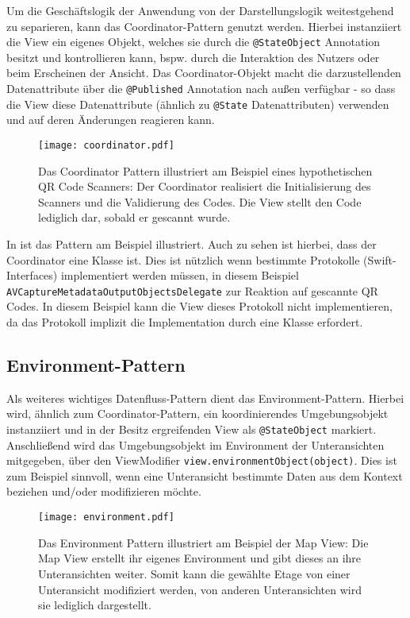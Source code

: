 Um die Geschäftslogik der Anwendung von der Darstellungslogik weitestgehend zu separieren, kann das Coordinator-Pattern genutzt werden. Hierbei instanziiert die View ein eigenes Objekt, welches sie durch die \texttt{@StateObject} Annotation besitzt und kontrollieren kann, bspw. durch die Interaktion des Nutzers oder beim Erscheinen der Ansicht. Das Coordinator-Objekt macht die darzustellenden Datenattribute über die \texttt{@Published} Annotation nach außen verfügbar - so dass die View diese Datenattribute (ähnlich zu \texttt{@State} Datenattributen) verwenden und auf deren Änderungen reagieren kann.

\begin{figure}[H]
\texttt{[image: coordinator.pdf]}
\caption{Das Coordinator Pattern illustriert am Beispiel eines hypothetischen QR Code Scanners: Der Coordinator realisiert die Initialisierung des Scanners und die Validierung des Codes. Die View stellt den Code lediglich dar, sobald er gescannt wurde.}\label{fig:coordinator}
\end{figure}

In  ist das Pattern am Beispiel illustriert. Auch zu sehen ist hierbei, dass der Coordinator eine Klasse ist. Dies ist nützlich wenn bestimmte Protokolle (Swift-Interfaces) implementiert werden müssen, in diesem Beispiel \texttt{AVCaptureMetadataOutputObjectsDelegate} zur Reaktion auf gescannte QR Codes. In diesem Beispiel kann die View dieses Protokoll nicht implementieren, da das Protokoll implizit die Implementation durch eine Klasse erfordert.

\subsection{Environment-Pattern}

Als weiteres wichtiges Datenfluss-Pattern dient das Environment-Pattern. Hierbei wird, ähnlich zum Coordinator-Pattern, ein koordinierendes Umgebungsobjekt instanziiert und in der Besitz ergreifenden View als \texttt{@StateObject} markiert. Anschließend wird das Umgebungsobjekt im Environment der Unteransichten mitgegeben, über den ViewModifier \texttt{view.environmentObject(object)}. Dies ist zum Beispiel sinnvoll, wenn eine Unteransicht bestimmte Daten aus dem Kontext beziehen und/oder modifizieren möchte.

\begin{figure}[H]
\texttt{[image: environment.pdf]}
\caption{Das Environment Pattern illustriert am Beispiel der Map View: Die Map View erstellt ihr eigenes Environment und gibt dieses an ihre Unteransichten weiter. Somit kann die gewählte Etage von einer Unteransicht modifiziert werden, von anderen Unteransichten wird sie lediglich dargestellt.}\label{fig:coordinator}
\end{figure}

